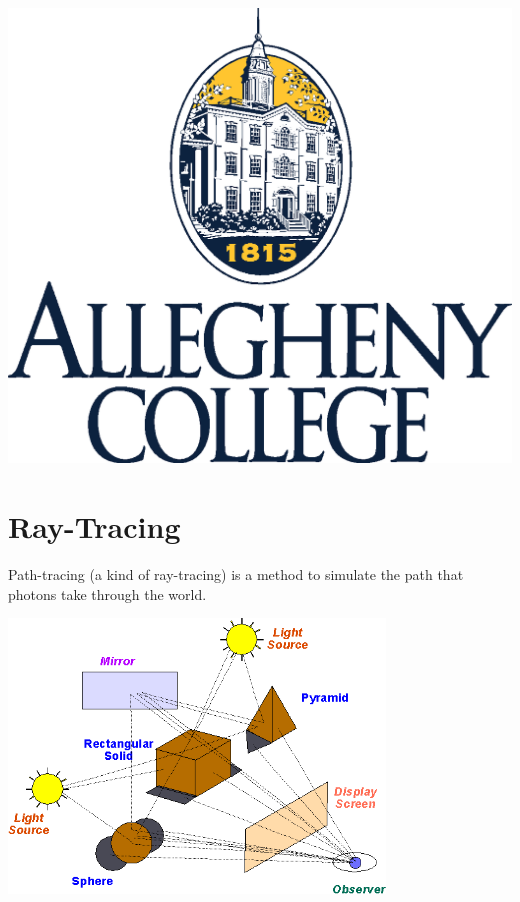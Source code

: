 \documentclass[alleghenyposter]{betterposter}
\begin{document}
{%
\vfill

\includegraphics[width=\textwidth]{img/allegheny-logo}\\

}{

\section{Ray-Tracing}
Path-tracing (a kind of ray-tracing) is a method to simulate the path that photons take through the world.

\begin{center}
\includegraphics[width=0.75\textwidth]{img/world}
\end{center}

}
\end{document}
